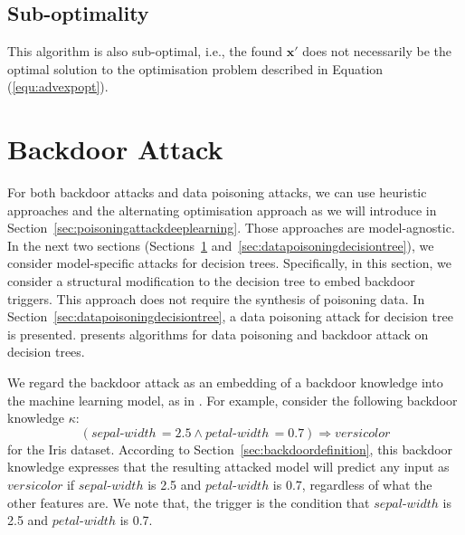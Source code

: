 \subsection*{Sub-optimality}

This algorithm is also sub-optimal, i.e., the found $\textbf{x}'$ does not necessarily be the optimal solution to the optimisation problem described in Equation (\ref{equ:advexpopt}). 

\section{Backdoor Attack}\label{sec:backdoordecisiontree}

For both backdoor attacks and data poisoning attacks, we can use heuristic approaches and the alternating optimisation approach as we will introduce in Section~\ref{sec:poisoningattackdeeplearning}. Those approaches are model-agnostic. In the next two sections (Sections~\ref{sec:backdoordecisiontree} and~\ref{sec:datapoisoningdecisiontree}), we consider model-specific attacks for decision trees. Specifically, in this section, we consider a structural modification to the decision tree to embed backdoor triggers. This approach does not require the synthesis of poisoning data. 
In Section~\ref{sec:datapoisoningdecisiontree}, a data poisoning attack for decision tree is presented. \cite{huang2020embedding} presents algorithms for data poisoning and backdoor attack on decision trees. 


We regard the backdoor attack as an embedding of a backdoor knowledge into the machine learning model, as in \cite{9451178}. For example, consider the following backdoor knowledge $\kappa$:
\begin{equation}\label{equ:backdoorexample}
\left(sepal\text{-}width \,  = 2.5  \wedge petal\text{-}width \,  = 0.7\right) \Rightarrow versicolor    
\end{equation}
for the Iris dataset. According to  Section~\ref{sec:backdoordefinition}, this backdoor knowledge expresses that the resulting attacked model will predict any input as $versicolor$ if  $sepal\text{-}width$ is 2.5 and $petal\text{-}width$ is 0.7, regardless of what the other features are. We note that, the trigger is the condition that $sepal\text{-}width$ is 2.5 and $petal\text{-}width$ is 0.7. 

